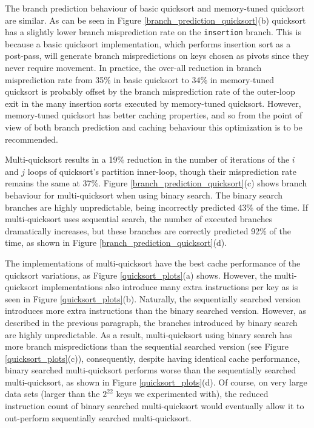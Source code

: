 \documentclass[acmtocl]{acmtrans2m}
\begin{document}
The branch prediction behaviour of basic quicksort and memory-tuned quicksort
are similar.  As can be seen in Figure \ref{branch_prediction_quicksort}(b)
quicksort has a slightly lower branch misprediction rate on the
\texttt{insertion} branch. This is because a basic quicksort implementation,
which performs insertion sort as a post-pass, will generate branch
mispredictions on keys chosen as pivots since they never require movement.  In
practice, the over-all reduction in branch misprediction rate from 35\% in basic
quicksort to 34\% in memory-tuned quicksort is probably offset by the branch
misprediction rate of the outer-loop exit in the many insertion sorts executed
by memory-tuned quicksort. However, memory-tuned quicksort has better caching
properties, and so from the point of view of both branch prediction and caching
behaviour this optimization is to be recommended. 

Multi-quicksort results in a 19\% reduction in the number of iterations of the
$i$ and $j$ loops of quicksort's partition inner-loop, though their
misprediction rate remains the same at 37\%. Figure
\ref{branch_prediction_quicksort}(c) shows branch behaviour for multi-quicksort
when using binary search. The binary search branches are highly unpredictable,
being incorrectly predicted 43\% of the time. If multi-quicksort uses sequential
search, the number of executed branches dramatically increases, but these
branches are correctly predicted 92\% of the time, as shown in Figure
\ref{branch_prediction_quicksort}(d). 

The implementations of multi-quicksort have the best cache performance of the
quicksort variations, as Figure \ref{quicksort_plots}(a) shows.  However, the
multi-quicksort implementations also introduce many extra instructions per key
as is seen in Figure \ref{quicksort_plots}(b).  Naturally, the sequentially
searched version introduces more extra instructions than the binary searched
version. However, as described in the previous paragraph, the branches
introduced by binary search are highly unpredictable. As a result,
multi-quicksort using binary search has more branch mispredictions than the
sequential searched version (see Figure \ref{quicksort_plots}(c)), consequently,
despite having identical cache performance, binary searched multi-quicksort
performs worse than the sequentially searched multi-quicksort, as shown in
Figure \ref{quicksort_plots}(d). Of course, on very large data sets (larger than
the $2^{22}$ keys we experimented with), the reduced instruction count of binary
searched multi-quicksort would eventually allow it to out-perform sequentially
searched multi-quicksort.
\end{document}
